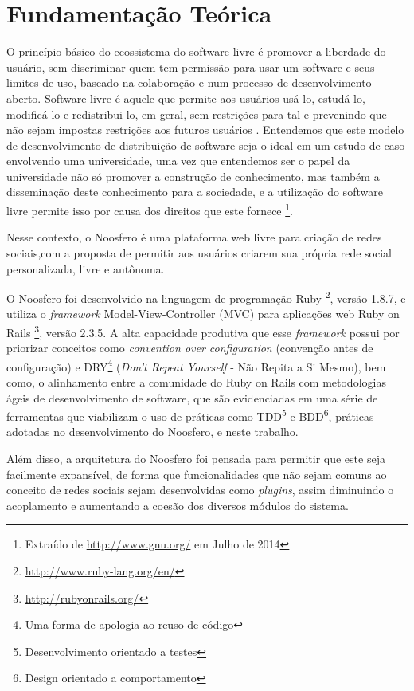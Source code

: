 \section{Fundamentação Teórica}
\label{sec:fundamentacao}

O princípio básico do ecossistema do software livre é promover a liberdade
do usuário, sem discriminar quem tem permissão para usar um software e seus
limites de uso, baseado na colaboração e num processo de desenvolvimento
aberto. Software livre é aquele que permite aos usuários usá-lo, estudá-lo,
modificá-lo e redistribui-lo, em geral, sem restrições para tal e prevenindo
que não sejam impostas restrições aos futuros usuários \cite{meirelles2013}.
Entendemos que este modelo de desenvolvimento de distribuição de software
seja o ideal em um estudo de caso envolvendo uma universidade, uma vez que
entendemos ser o papel da universidade não só promover a construção de
conhecimento, mas também a disseminação deste conhecimento para a sociedade,
e a utilização do software livre permite isso por causa dos direitos
que este fornece%
\footnote{Extraído de \url{http://www.gnu.org/} em Julho de 2014}.

Nesse contexto, o Noosfero é uma plataforma web livre para criação de redes sociais,com a proposta
de permitir aos usuários criarem sua própria
rede social personalizada, livre e autônoma.

O Noosfero foi desenvolvido na linguagem de programação Ruby
%
\footnote{\url{http://www.ruby-lang.org/en/}},
versão 1.8.7, e utiliza o \textit{framework} Model-View-Controller (MVC) para
aplicações web Ruby on Rails%
\footnote{\url{http://rubyonrails.org/}}, versão 2.3.5.
%
A alta capacidade produtiva que esse \textit{framework} possui por priorizar conceitos como
\textit{convention over configuration} (convenção antes de configuração)
e DRY\footnote{Uma forma de apologia ao reuso de código}
(\textit{Don't Repeat Yourself} - Não Repita a Si Mesmo), bem como, o alinhamento
entre a comunidade do Ruby on Rails com metodologias ágeis de
desenvolvimento de software, que são evidenciadas em uma série de ferramentas que
viabilizam o uso de práticas como TDD\footnote{Desenvolvimento orientado a testes}
e BDD\footnote{Design orientado a comportamento}, práticas adotadas no
desenvolvimento do Noosfero, e neste trabalho.

Além disso, a arquitetura do Noosfero foi pensada para permitir que este seja facilmente
expansível, de forma que funcionalidades que não sejam comuns ao conceito de
redes sociais sejam desenvolvidas como \textit{plugins}, assim diminuindo
o acoplamento e aumentando a coesão dos diversos módulos do sistema.

